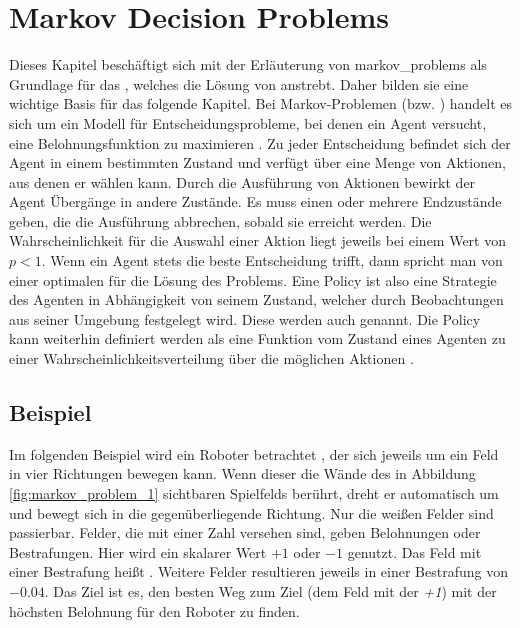 \section{Markov Decision Problems}\label{markov_decision_problems}
Dieses Kapitel beschäftigt sich mit der Erläuterung von \acp{markov_problem} als Grundlage für das , welches die Lösung von  anstrebt. Daher bilden sie eine wichtige Basis für das folgende Kapitel. 
Bei Markov-Problemen (bzw. ) handelt es sich um ein Modell für Entscheidungsprobleme, bei denen ein Agent versucht, eine Belohnungsfunktion zu maximieren \cite{ai_for_game_devs} \cite{reinforcement_introduction_book} \cite{deep_reinforcement_paper} \cite{art_int_mod_app} \cite{dammann_reinforcement} \cite{alzantot} \cite{mohammad_markov}. Zu jeder Entscheidung befindet sich der Agent in einem bestimmten Zustand und verfügt über eine Menge von Aktionen, aus denen er wählen kann. Durch die Ausführung von Aktionen bewirkt der Agent Übergänge in andere Zustände. Es muss einen oder mehrere Endzustände geben, die die Ausführung abbrechen, sobald sie erreicht werden. Die Wahrscheinlichkeit für die Auswahl einer Aktion liegt jeweils bei einem Wert von $p < 1$.
Wenn ein Agent stets die beste Entscheidung trifft, dann spricht man von einer optimalen  für die Lösung des Problems. Eine Policy ist also eine Strategie des Agenten in Abhängigkeit von seinem Zustand, welcher durch Beobachtungen aus seiner Umgebung festgelegt wird. Diese werden auch  genannt. Die Policy kann weiterhin definiert werden als eine Funktion vom Zustand eines Agenten zu einer Wahrscheinlichkeitsverteilung über die möglichen Aktionen \cite{openai_five_paper}.

\subsection{Beispiel}
Im folgenden Beispiel wird ein Roboter betrachtet \cite{markov_robot_example}, der sich jeweils um ein Feld in vier Richtungen bewegen kann. Wenn dieser die Wände des in Abbildung \ref{fig:markov_problem_1} sichtbaren Spielfelds berührt, dreht er automatisch um und bewegt sich in die gegenüberliegende Richtung. Nur die weißen Felder sind passierbar. Felder, die mit einer Zahl versehen sind, geben Belohnungen oder Bestrafungen. Hier wird ein skalarer Wert $+1$ oder $-1$ genutzt. Das Feld mit einer Bestrafung heißt . Weitere Felder resultieren jeweils in einer Bestrafung von $-0.04$. Das Ziel ist es, den besten Weg zum Ziel (dem Feld mit der \textit{+1}) mit der höchsten Belohnung für den Roboter zu finden.

